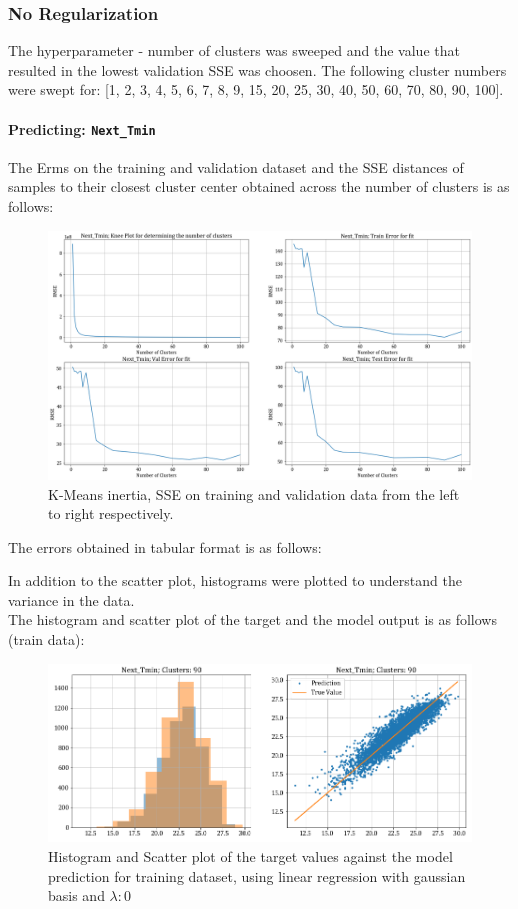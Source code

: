 \documentclass[12pt,a4paper]{article}
\newcommand{\noi}{\noindent}
\def\tt#1{\texttt{#1}}
\begin{document}
\subsubsection{No Regularization}
The hyperparameter - number of clusters was sweeped and the value that resulted in the lowest validation SSE was choosen. The following cluster numbers were swept for: [1, 2, 3, 4, 5, 6, 7, 8, 9, 15, 20, 25, 30, 40, 50, 60, 70, 80, 90, 100].

\paragraph{Predicting: \tt{Next\_Tmin}}
The Erms on the training and validation dataset and the SSE distances of samples to their closest cluster center obtained across the number of clusters is as follows:
\begin{figure}[H]
     \centering
     \includegraphics[scale=0.4]{images/t3_d3/no_reg/tmin_errors.png}
     \caption{K-Means inertia, SSE on training and validation data from the left to right respectively.}
\end{figure}

\vspace{-1em}
The errors obtained in tabular format is as follows:


\noi
In addition to the scatter plot, histograms were plotted to understand the variance in the data.\\

\noi
The histogram and scatter plot of the target and the model output is as follows (train data):
\begin{figure}[H]
     \centering
     \includegraphics[scale=0.49]{images/t3_d3/no_reg/T_min_nclu_90.png}
     \caption{Histogram and Scatter plot of the target values against the model prediction for training dataset, using linear regression with gaussian basis and $\lambda: 0$}
\end{figure}
\end{document}

